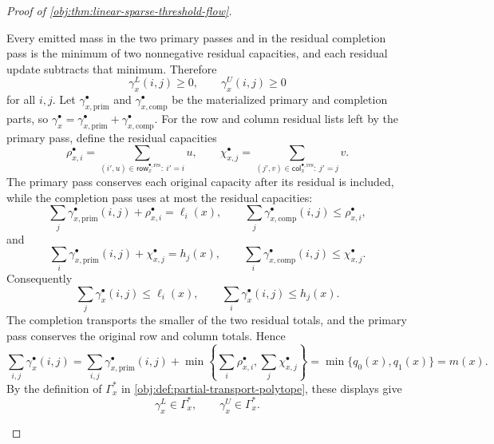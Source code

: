 \begin{proof}[Proof of \cref{obj:thm:linear-sparse-threshold-flow}]
\begin{enumerate}
Every emitted mass in the two primary passes and in the residual completion pass is the minimum of two nonnegative residual capacities, and each residual update subtracts that minimum.  Therefore
\[
\gamma_x^L(i,j)\ge0,
\qquad
\gamma_x^U(i,j)\ge0
\]
for all \(i,j\).  Let \(\gamma_{x,\mathrm{prim}}^\bullet\) and \(\gamma_{x,\mathrm{comp}}^\bullet\) be the materialized primary and completion parts, so \(\gamma_x^\bullet=\gamma_{x,\mathrm{prim}}^\bullet+\gamma_{x,\mathrm{comp}}^\bullet\).  For the row and column residual lists left by the primary pass, define the residual capacities
\[
\rho_{x,i}^\bullet
=
\sum_{(i',u)\in\mathsf{row}_{x}^{\bullet,\mathrm{res}}:\ i'=i}u,
\qquad
\chi_{x,j}^\bullet
=
\sum_{(j',v)\in\mathsf{col}_{x}^{\bullet,\mathrm{res}}:\ j'=j}v .
\]
The primary pass conserves each original capacity after its residual is included, while the completion pass uses at most the residual capacities:
\[
\sum_j\gamma_{x,\mathrm{prim}}^\bullet(i,j)+\rho_{x,i}^\bullet=\ell_i(x),
\qquad
\sum_j\gamma_{x,\mathrm{comp}}^\bullet(i,j)\le \rho_{x,i}^\bullet,
\]
and
\[
\sum_i\gamma_{x,\mathrm{prim}}^\bullet(i,j)+\chi_{x,j}^\bullet=h_j(x),
\qquad
\sum_i\gamma_{x,\mathrm{comp}}^\bullet(i,j)\le \chi_{x,j}^\bullet.
\]
Consequently
\[
\sum_j\gamma_x^\bullet(i,j)\le\ell_i(x),
\qquad
\sum_i\gamma_x^\bullet(i,j)\le h_j(x).
\]
The completion transports the smaller of the two residual totals, and the primary pass conserves the original row and column totals.  Hence
\[
\sum_{i,j}\gamma_x^\bullet(i,j)
=
\sum_{i,j}\gamma_{x,\mathrm{prim}}^\bullet(i,j)
+\min\left\{\sum_i\rho_{x,i}^\bullet,\sum_j\chi_{x,j}^\bullet\right\}
=\min\{q_0(x),q_1(x)\}=m(x).
\]
By the definition of \(\Gamma_x^\ast\) in \cref{obj:def:partial-transport-polytope}, these displays give
\[
\gamma_x^L\in\Gamma_x^\ast,
\qquad
\gamma_x^U\in\Gamma_x^\ast.
\]


\end{enumerate}
\end{proof}
